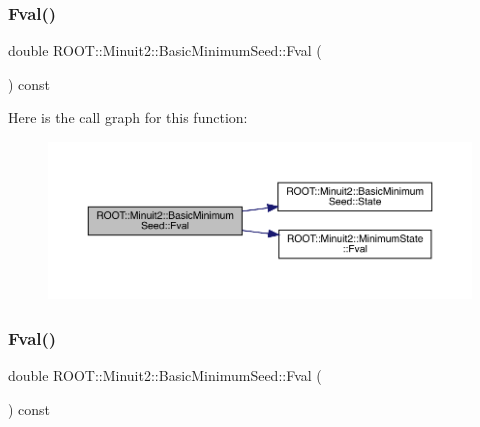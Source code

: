 \subsubsection{\texorpdfstring{Fval()}{Fval()}\hspace{0.1cm}{\footnotesize\ttfamily [2/3]}}
{\footnotesize\ttfamily double R\+O\+O\+T\+::\+Minuit2\+::\+Basic\+Minimum\+Seed\+::\+Fval (\begin{DoxyParamCaption}{ }\end{DoxyParamCaption}) const\hspace{0.3cm}{\ttfamily [inline]}}

Here is the call graph for this function\+:
\nopagebreak
\begin{figure}[H]
\begin{center}
\leavevmode
\includegraphics[width=350pt]{de/d50/classROOT_1_1Minuit2_1_1BasicMinimumSeed_a40b43b611717121256cd72bf40a3d5d7_cgraph}
\end{center}
\end{figure}
\mbox{\label{classROOT_1_1Minuit2_1_1BasicMinimumSeed_a40b43b611717121256cd72bf40a3d5d7}} 
\subsubsection{\texorpdfstring{Fval()}{Fval()}\hspace{0.1cm}{\footnotesize\ttfamily [3/3]}}
{\footnotesize\ttfamily double R\+O\+O\+T\+::\+Minuit2\+::\+Basic\+Minimum\+Seed\+::\+Fval (\begin{DoxyParamCaption}{ }\end{DoxyParamCaption}) const\hspace{0.3cm}{\ttfamily [inline]}}

